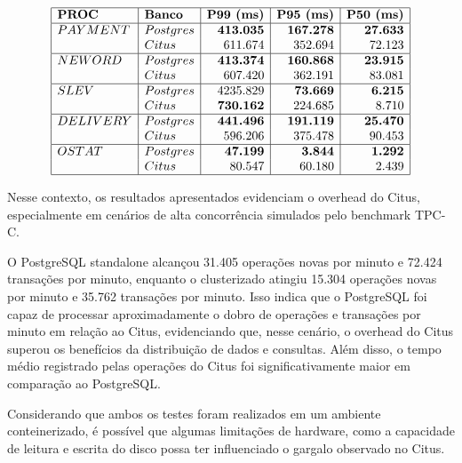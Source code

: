 \[
\begin{array}{|l|l|r|r|r|}
\hline
\textbf{PROC} & \textbf{Banco} & \textbf{P99 (ms)} & \textbf{P95 (ms)} & \textbf{P50 (ms)} \\
\hline
PAYMENT & Postgres & \textbf{413.035} & \textbf{167.278} & \textbf{27.633} \\
        & Citus    & 611.674          & 352.694          & 72.123 \\
\hline
NEWORD  & Postgres & \textbf{413.374} & \textbf{160.868} & \textbf{23.915} \\
        & Citus    & 607.420          & 362.191          & 83.081 \\
\hline
SLEV    & Postgres & 4235.829         & \textbf{73.669}  & \textbf{6.215} \\
        & Citus    & \textbf{730.162} & 224.685          & 8.710 \\
\hline
DELIVERY& Postgres & \textbf{441.496} & \textbf{191.119} & \textbf{25.470} \\
        & Citus    & 596.206          & 375.478          & 90.453 \\
\hline
OSTAT   & Postgres & \textbf{47.199}  & \textbf{3.844}   & \textbf{1.292} \\
        & Citus    & 80.547           & 60.180           & 2.439 \\
\hline
\end{array}
\]

Nesse contexto, os resultados apresentados evidenciam o overhead do Citus, especialmente em cenários de alta concorrência simulados pelo benchmark TPC-C.

O PostgreSQL standalone alcançou 31.405 operações novas por minuto e 72.424 transações por minuto, 
enquanto o clusterizado atingiu 15.304 operações novas por minuto e 35.762 transações por minuto.
Isso indica que o PostgreSQL foi capaz de processar aproximadamente o dobro de operações e transações por minuto em relação ao Citus,
evidenciando que, nesse cenário, o overhead do Citus superou os benefícios da distribuição de dados e consultas.
Além disso, o tempo médio registrado pelas operações do Citus foi significativamente maior em comparação ao PostgreSQL.

Considerando que ambos os testes foram realizados em um ambiente conteinerizado, é possível que 
algumas limitações de hardware, como a capacidade de leitura e escrita do disco possa ter influenciado o gargalo observado no Citus.
